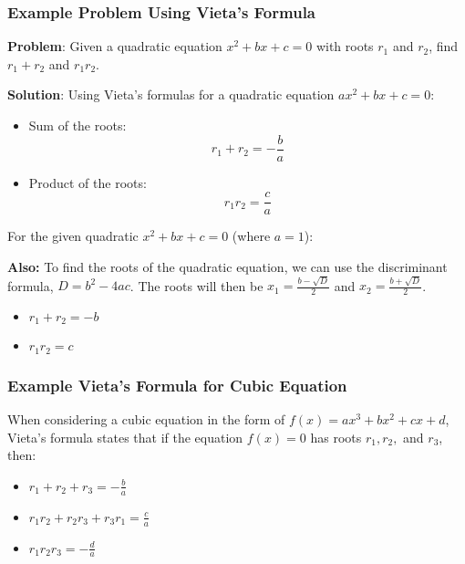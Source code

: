         \subsubsection*{Example Problem Using Vieta's Formula}

        \textbf{Problem}: Given a quadratic equation \(x^2 + bx + c = 0\) with roots \(r_1\) and \(r_2\), find \(r_1 + r_2\) and \(r_1r_2\).

        \textbf{Solution}:
        Using Vieta's formulas for a quadratic equation \(ax^2 + bx + c = 0\):

        \begin{itemize}
            \item Sum of the roots:
            \[
            r_1 + r_2 = -\frac{b}{a}
            \]
            \item Product of the roots:
            \[
            r_1r_2 = \frac{c}{a}
            \]
        \end{itemize}

        For the given quadratic \(x^2 + bx + c = 0\) (where \(a = 1\)):

        \textbf{Also:}
        To find the roots of the quadratic equation, we can use the discriminant formula, \( D = b^2 - 4ac \). The roots will then be \( x_1 = \frac{b - \sqrt{D}}{2} \) and \( x_2 = \frac{b + \sqrt{D}}{2} \).


        \begin{itemize}
            \item \(r_1 + r_2 = -b\)
            \item \(r_1r_2 = c\)
        \end{itemize}

        \subsubsection*{Example Vieta's Formula for Cubic Equation}

        When considering a cubic equation in the form of \( f(x) = ax^3 + bx^2 + cx + d \), Vieta's formula states that if the equation \( f(x) = 0 \) has roots \( r_1, r_2, \) and \( r_3 \), then:

        \begin{itemize}
            \item \( r_1 + r_2 + r_3 = -\frac{b}{a} \)
            \item \( r_1r_2 + r_2r_3 + r_3r_1 = \frac{c}{a} \)
            \item \( r_1r_2r_3 = -\frac{d}{a} \)
        \end{itemize}